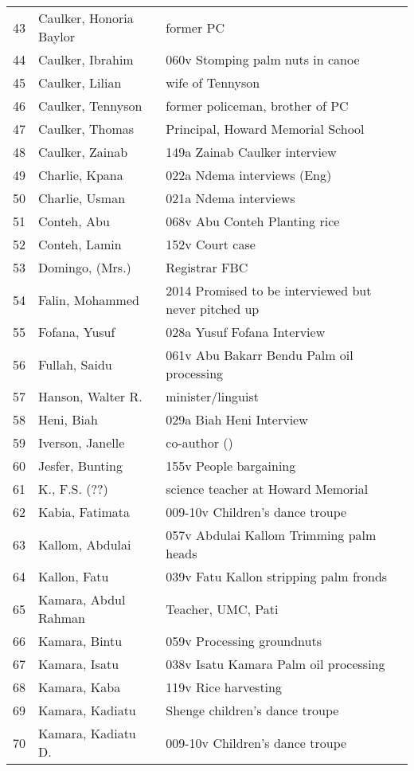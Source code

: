 \begin{xltabular}{\textwidth}{llQ}
 43 & Caulker, Honoria Baylor & former PC\\
 44 & Caulker, Ibrahim & 060v Stomping palm nuts in canoe\\
 45 & Caulker, Lilian & wife of Tennyson\\
 46 & Caulker, Tennyson & former policeman, brother of PC\\
 47 & Caulker, Thomas & Principal, Howard Memorial School\\
 48 & Caulker, Zainab & 149a Zainab Caulker interview\\
 49 & Charlie, Kpana & 022a Ndema interviews (Eng)\\
 50 & Charlie, Usman & 021a Ndema interviews\\
 51 & Conteh, Abu & 068v Abu Conteh Planting rice\\
 52 & Conteh, Lamin & 152v Court case\\
 53 & Domingo, (Mrs.) & Registrar FBC\\
 54 & Falin, Mohammed & 2014 Promised to be interviewed but never pitched up\\
 55 & Fofana, Yusuf & 028a Yusuf Fofana Interview\\
 56 & Fullah, Saidu & 061v Abu Bakarr Bendu Palm oil processing\\
 57 & Hanson, Walter R. & minister/linguist\\
 58 & Heni, Biah & 029a Biah Heni Interview\\
 59 & Iverson, Janelle & co-author (\citealt{IversonCameron1986})\\
 60 & Jesfer, Bunting & 155v People bargaining\\
 61 & K., F.S. (??) & science teacher at Howard Memorial\\
 62 & Kabia, Fatimata & 009-10v Children's dance troupe\\
 63 & Kallom, Abdulai & 057v Abdulai Kallom Trimming palm heads\\
 64 & Kallon, Fatu & 039v Fatu Kallon stripping palm fronds\\
 65 & Kamara, Abdul Rahman & Teacher, UMC, Pati\\
 66 & Kamara, Bintu & 059v Processing groundnuts\\
 67 & Kamara, Isatu & 038v Isatu Kamara Palm oil processing\\
 68 & Kamara, Kaba & 119v Rice harvesting\\
 69 & Kamara, Kadiatu & Shenge children's dance troupe\\
 70 & Kamara, Kadiatu D. & 009-10v Children's dance troupe\\

\end{xltabular}
